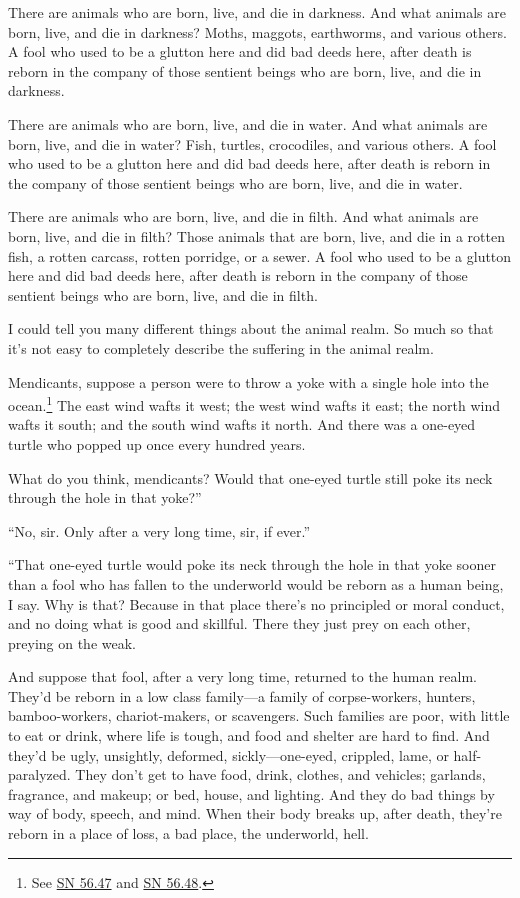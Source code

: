 \documentclass[12pt,openany]{book}%
\begin{document}
There are animals who are born, live, and die in darkness. And what animals are born, live, and die in darkness? Moths, maggots, earthworms, and various others. A fool who used to be a glutton here and did bad deeds here, after death is reborn in the company of those sentient beings who are born, live, and die in darkness. 

There are animals who are born, live, and die in water. And what animals are born, live, and die in water? Fish, turtles, crocodiles, and various others. A fool who used to be a glutton here and did bad deeds here, after death is reborn in the company of those sentient beings who are born, live, and die in water. 

There are animals who are born, live, and die in filth. And what animals are born, live, and die in filth? Those animals that are born, live, and die in a rotten fish, a rotten carcass, rotten porridge, or a sewer. A fool who used to be a glutton here and did bad deeds here, after death is reborn in the company of those sentient beings who are born, live, and die in filth. 

I could tell you many different things about the animal realm. So much so that it’s not easy to completely describe the suffering in the animal realm. 

Mendicants, suppose a person were to throw a yoke with a single hole into the ocean.\footnote{See \href{https://suttacentral.net/sn56.47/en/sujato}{SN 56.47} and \href{https://suttacentral.net/sn56.48/en/sujato}{SN 56.48}. } The east wind wafts it west; the west wind wafts it east; the north wind wafts it south; and the south wind wafts it north. And there was a one-eyed turtle who popped up once every hundred years. 

What do you think, mendicants? Would that one-eyed turtle still poke its neck through the hole in that yoke?” 

“No, sir. Only after a very long time, sir, if ever.” 

“That one-eyed turtle would poke its neck through the hole in that yoke sooner than a fool who has fallen to the underworld would be reborn as a human being, I say. Why is that? Because in that place there’s no principled or moral conduct, and no doing what is good and skillful. There they just prey on each other, preying on the weak. 

And suppose that fool, after a very long time, returned to the human realm. They’d be reborn in a low class family—a family of corpse-workers, hunters, bamboo-workers, chariot-makers, or scavengers. Such families are poor, with little to eat or drink, where life is tough, and food and shelter are hard to find. And they’d be ugly, unsightly, deformed, sickly—one-eyed, crippled, lame, or half-paralyzed. They don’t get to have food, drink, clothes, and vehicles; garlands, fragrance, and makeup; or bed, house, and lighting. And they do bad things by way of body, speech, and mind. When their body breaks up, after death, they’re reborn in a place of loss, a bad place, the underworld, hell. 
\end{document}
